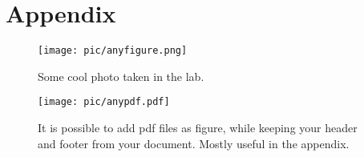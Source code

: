 \clearpage

\chapter*{\textbf{Appendix}}\label{appendix}

\begin{figure}[htb]
	\centering
		\texttt{[image: pic/anyfigure.png]}

	\caption[Cool picture]{Some cool photo taken in the lab.}

	\label{fig:anyfigure}
\end{figure}

\begin{figure}[htb]
	\centering

		\texttt{[image: pic/anypdf.pdf]}

	\caption[Adding PDF as figure]{It is possible to add pdf files as figure, while keeping your header and footer from your document. Mostly useful in the appendix.}

	\label{fig:pdf}
\end{figure}
